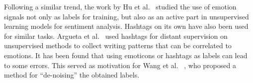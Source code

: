 \documentclass[12pt,a4paper]{report}
\theoremstyle{definition}
\begin{document}
\begin{CJK}{UTF8}{bsmi}
        
        
        
        \par Following a similar trend, the work by Hu et al.~\cite{hu2013unsupervised}  studied the use of emotion signals not only as labels for training, but also as an active part in unsupervised learning models for sentiment analysis. Hashtags on its own have also been used for similar tasks. Argueta et al.~\cite{argueta2016multilingual} used hashtags for distant supervision on unsupervised methods to collect writing patterns that can be correlated to emotions. It has been found that using emoticons or hashtags as labels can lead to some errors. This served as motivation for Wang et al. ~\cite{wang2016sentiment}, who proposed a method for “de-noising” the obtained labels.


\end{CJK}
\end{document}
